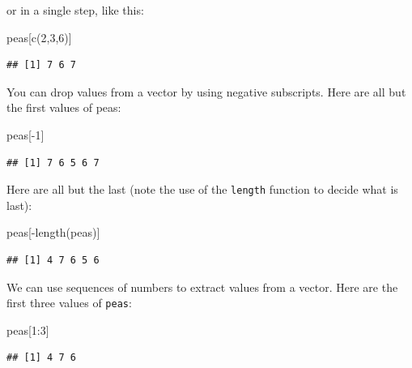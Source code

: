 \documentclass[
]{book}
\newenvironment{Shaded}{\begin{snugshade}}{\end{snugshade}}
\newcommand{\DecValTok}[1]{\textcolor[rgb]{0.00,0.00,0.81}{#1}}
\newcommand{\FunctionTok}[1]{\textcolor[rgb]{0.00,0.00,0.00}{#1}}
\newcommand{\NormalTok}[1]{#1}
\newcommand{\SpecialCharTok}[1]{\textcolor[rgb]{0.00,0.00,0.00}{#1}}
\theoremstyle{definition}
\theoremstyle{definition}
\theoremstyle{definition}
\theoremstyle{definition}
\theoremstyle{remark}
\begin{document}
or in a single step, like this:

\begin{Shaded}
\begin{Highlighting}[]
\NormalTok{peas[}\FunctionTok{c}\NormalTok{(}\DecValTok{2}\NormalTok{,}\DecValTok{3}\NormalTok{,}\DecValTok{6}\NormalTok{)]}
\end{Highlighting}
\end{Shaded}

\begin{verbatim}
## [1] 7 6 7
\end{verbatim}

You can drop values from a vector by using negative subscripts. Here are all but the first values of peas:

\begin{Shaded}
\begin{Highlighting}[]
\NormalTok{peas[}\SpecialCharTok{{-}}\DecValTok{1}\NormalTok{]}
\end{Highlighting}
\end{Shaded}

\begin{verbatim}
## [1] 7 6 5 6 7
\end{verbatim}

Here are all but the last (note the use of the \texttt{length} function to decide what is last):

\begin{Shaded}
\begin{Highlighting}[]
\NormalTok{peas[}\SpecialCharTok{{-}}\FunctionTok{length}\NormalTok{(peas)]}
\end{Highlighting}
\end{Shaded}

\begin{verbatim}
## [1] 4 7 6 5 6
\end{verbatim}

We can use sequences of numbers to extract values from a vector. Here are the first three values of \texttt{peas}:

\begin{Shaded}
\begin{Highlighting}[]
\NormalTok{peas[}\DecValTok{1}\SpecialCharTok{:}\DecValTok{3}\NormalTok{]}
\end{Highlighting}
\end{Shaded}

\begin{verbatim}
## [1] 4 7 6
\end{verbatim}
\end{document}
